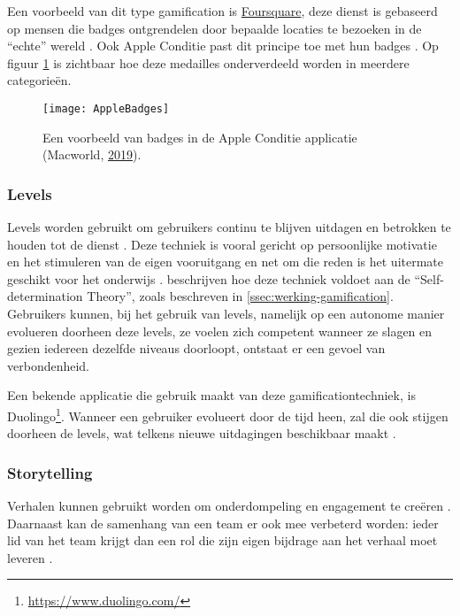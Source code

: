Een voorbeeld van dit type gamification is \href{https://foursquare.com/}{Foursquare}, deze dienst is gebaseerd op mensen die badges ontgrendelen door bepaalde locaties te bezoeken in de ``echte'' wereld \autocite{Hamari2011}. Ook Apple Conditie past dit principe toe met hun badges \autocite{Ha2020}. Op figuur \ref{fig:apple_badges} is zichtbaar hoe deze medailles onderverdeeld worden in meerdere categorieën.

\begin{figure}[h]
    \caption[Badges in de Apple Conditie applicatie]{Een voorbeeld van badges in de Apple Conditie applicatie (Macworld, \href{https://www.macworld.com/article/231140/how-to-get-all-of-the-apple-watch-activity-challenge-badges.html}{2019}).}
    \texttt{[image: AppleBadges]}
    \label{fig:apple_badges}
\end{figure}

\subsubsection{Levels}
\label{sssec:levels}
Levels worden gebruikt om gebruikers continu te blijven uitdagen en betrokken te houden tot de dienst \autocite{Dong2012}. Deze techniek is vooral gericht op persoonlijke motivatie en het stimuleren van de eigen vooruitgang en net om die reden is het uitermate geschikt voor het onderwijs \autocite{ManzanoLeon2021}.
\textcite{ManzanoLeon2021} beschrijven hoe deze techniek voldoet aan de ``Self-determination Theory'', zoals beschreven in \ref{ssec:werking-gamification}. Gebruikers kunnen, bij het gebruik van levels, namelijk op een autonome manier evolueren doorheen deze levels, ze voelen zich competent wanneer ze slagen en gezien iedereen dezelfde niveaus doorloopt, ontstaat er een gevoel van verbondenheid.

Een bekende applicatie die gebruik maakt van deze gamificationtechniek, is Duolingo\footnote{\href{https://www.duolingo.com/}{https://www.duolingo.com/}}. Wanneer een gebruiker evolueert door de tijd heen, zal die ook stijgen doorheen de levels, wat telkens nieuwe uitdagingen beschikbaar maakt \autocite{Shortt2021}.

\subsubsection{Storytelling}
Verhalen kunnen gebruikt worden om onderdompeling en engagement te creëren \autocite{ManzanoLeon2021}. Daarnaast kan de samenhang van een team er ook mee verbeterd worden: ieder lid van het team krijgt dan een rol die zijn eigen bijdrage aan het verhaal moet leveren \autocite{ManzanoLeon2021}.

